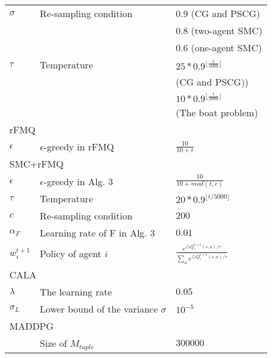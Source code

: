 \documentclass[journal,transmag]{IEEEtran}
\begin{document}
\begin{table}[h!]
\begin{tabular}{l|l|l}
\hline
  $\sigma$              &  Re-sampling condition                 &   $0.9$ (CG and PSCG)              \\
                        &                                        &   $0.8$ (two-agent SMC)             \\
                        &                                        &   $0.6$ (one-agent SMC)           \\
  $\tau $               &  Temperature                           &   $25*0.9^{\lfloor \frac{t}{5000}\rfloor}$ \\
                        &                                        &   (CG and PSCG)) \\
                        &                                        &   $10*0.9^{\lfloor \frac{t}{2000}\rfloor}$ \\
                        &                                        &   (The boat problem)\\
\hline
\multicolumn{3}{l}{rFMQ} \\
\hline
  $\epsilon$            &  $\epsilon$-greedy in rFMQ             &    $\frac{10}{10+t}$             \\
\hline
\multicolumn{3}{l}{SMC+rFMQ} \\
\hline
  $\epsilon$            &  $\epsilon$-greedy in Alg. 3           &    $\frac{10}{10+mod(t,c)}$             \\
  $\tau $               &  Temperature                           &   $20*0.9^{\lfloor t/5000\rfloor}$ \\
  $c$                   &  Re-sampling condition                 &   $200 $               \\
  $\alpha_F$            &  Learning rate of F in Alg. 3          &   $0.01$                               \\
  $w_{i}^{t+1}$         &  Policy of agent $i$                   &   $\frac{e^{\triangle Q_{i}^{t+1}(s,a)/\tau}}{\sum_{a}e^{\triangle Q_{i}^{t+1}(s,a)/\tau}}$\\
\hline
\multicolumn{3}{l}{CALA} \\
\hline
  $\lambda$        &  The learning rate                     &   $0.05$   \\
  $\sigma_L$    &  Lower bound of the variance $\sigma$  &  $10^{-5}$ \\
\hline
\multicolumn{3}{l}{MADDPG} \\
\hline
                        &  Size of $M_{tuple}$                  &  $300000$    \\

\end{tabular}
\end{table}
\end{document}
